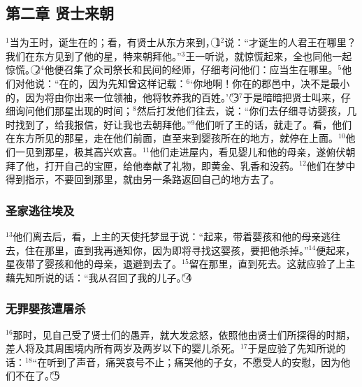 \subsection{第二章 贤士来朝}
$^{1}$当\UL[黑落德]为王时，\UL[耶稣]诞生在\UL[犹大]的\UL[白冷]；看，有贤士从东方来到\UL[耶路撒冷]，\textcircled{1}$^{2}$说：“才诞生的\UL[犹太]人君王在哪里？我们在东方见到了他的星，特来朝拜他。”$^{3}$\UL[黑落德]王一听说，就惊慌起来，全\UL[耶路撒冷]也同他一起惊慌。\textcircled{2}$^{4}$他便召集了众司祭长和民间的经师，仔细考问他们：\UL[默西亚]应当生在哪里。$^{5}$他们对他说：“在\UL[犹大]的\UL[白冷]，因为先知曾这样记载：$^{6}$‘你\UL[犹大]地\UL[白冷]啊！你在\UL[犹大]的郡邑中，决不是最小的，因为将由你出来一位领袖，他将牧养我的百姓\UL[以色列]。’”\textcircled{3}$^{7}$于是\UL[黑落德]暗暗把贤士叫来，仔细询问他们那星出现的时间；$^{8}$然后打发他们往\UL[白冷]去，说：“你们去仔细寻访婴孩，几时找到了，给我报信，好让我也去朝拜他。”$^{9}$他们听了王的话，就走了。看，他们在东方所见的那星，走在他们前面，直至来到婴孩所在的地方，就停在上面。$^{10}$他们一见到那星，极其高兴欢喜。$^{11}$他们走进屋内，看见婴儿和他的母亲\UL[玛利亚]，遂俯伏朝拜了他，打开自己的宝匣，给他奉献了礼物，即黄金、乳香和没药。$^{12}$他们在梦中得到指示，不要回到\UL[黑落德]那里，就由另一条路返回自己的地方去了。


\subsubsection{圣家逃往埃及}
$^{13}$他们离去后，看，上主的天使托梦显于\UL[若瑟]说：“起来，带着婴孩和他的母亲逃往\UL[埃及]去，住在那里，直到我再通知你，因为\UL[黑落德]即将寻找这婴孩，要把他杀掉。”$^{14}$\UL[若瑟]便起来，星夜带了婴孩和他的母亲，退避到\UL[埃及]去了。$^{15}$留在那里，直到\UL[黑落德]死去。这就应验了上主藉先知所说的话：“我从\UL[埃及]召回了我的儿子。”\textcircled{4}


\subsubsection{无罪婴孩遭屠杀}
$^{16}$那时，\UL[黑落德]见自己受了贤士们的愚弄，就大发忿怒，依照他由贤士们所探得的时期，差人将\UL[白冷]及其周围境内所有两岁及两岁以下的婴儿杀死。$^{17}$于是应验了\UL[耶肋米亚]先知所说的话：$^{18}$“在\UL[辣玛]听到了声音，痛哭哀号不止；\UL[辣黑耳]痛哭他的子女，不愿受人的安慰，因为他们不在了。”\textcircled{5}


